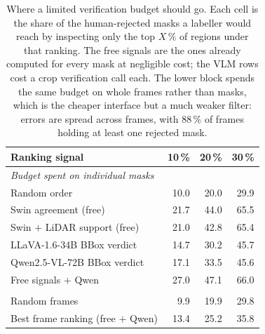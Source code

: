 \begin{table}[t]
\centering
\caption{Where a limited verification budget should go. Each cell is the share of the
         human-rejected masks a labeller would reach by inspecting only the top $X\,\%$ of
         regions under that ranking. The free signals are the ones already computed for every
         mask at negligible cost; the VLM rows cost a crop verification call each.
         The lower block spends the same budget on whole frames rather than masks, which is
         the cheaper interface but a much weaker filter: errors are spread across frames, with
         88\,\% of frames holding at least one rejected mask.}
\label{tab:review_targeting}
\begin{tabular}{lrrr}
\toprule
\textbf{Ranking signal} & \textbf{10\,\%} & \textbf{20\,\%} & \textbf{30\,\%} \\
\midrule
\multicolumn{4}{l}{\textit{Budget spent on individual masks}} \\
Random order                    & 10.0 & 20.0 & 29.9 \\
Swin agreement (free)           & 21.7 & 44.0 & 65.5 \\
Swin $+$ LiDAR support (free)   & 21.0 & 42.8 & 65.4 \\
LLaVA-1.6-34B BBox verdict      & 14.7 & 30.2 & 45.7 \\
Qwen2.5-VL-72B BBox verdict     & 17.1 & 33.5 & 45.6 \\
Free signals $+$ Qwen           & 27.0 & 47.1 & 66.0 \\
\addlinespace
\multicolumn{4}{l}{\textit{Budget spent on whole frames}} \\
Random frames                   & 9.9  & 19.9 & 29.8 \\
Best frame ranking (free $+$ Qwen) & 13.4 & 25.2 & 35.8 \\
\bottomrule
\end{tabular}
\end{table}
